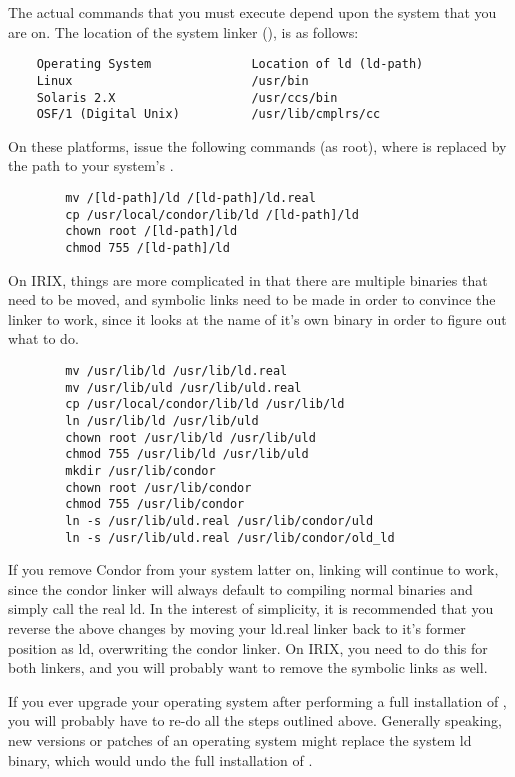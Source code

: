 The actual commands that you must execute depend upon the system that you
are on.  The location of the system linker (), is as follows:
\begin{verbatim}
	Operating System              Location of ld (ld-path)
	Linux                         /usr/bin
	Solaris 2.X                   /usr/ccs/bin
	OSF/1 (Digital Unix)          /usr/lib/cmplrs/cc
\end{verbatim}

On these platforms, issue the following commands (as root), where
 is replaced by the path to your system's .
\begin{verbatim}
        mv /[ld-path]/ld /[ld-path]/ld.real
        cp /usr/local/condor/lib/ld /[ld-path]/ld
        chown root /[ld-path]/ld
        chmod 755 /[ld-path]/ld
\end{verbatim}

On IRIX, things are more complicated in that there are multiple
 binaries that need to be moved, and symbolic links need to
be made in order to convince the linker to work, since it looks at the
name of it's own binary in order to figure out what to do.
\begin{verbatim}
        mv /usr/lib/ld /usr/lib/ld.real
        mv /usr/lib/uld /usr/lib/uld.real
        cp /usr/local/condor/lib/ld /usr/lib/ld
        ln /usr/lib/ld /usr/lib/uld
        chown root /usr/lib/ld /usr/lib/uld
        chmod 755 /usr/lib/ld /usr/lib/uld
        mkdir /usr/lib/condor
        chown root /usr/lib/condor
        chmod 755 /usr/lib/condor
        ln -s /usr/lib/uld.real /usr/lib/condor/uld
        ln -s /usr/lib/uld.real /usr/lib/condor/old_ld
\end{verbatim}

If you remove Condor from your system latter on, linking will continue
to work, since the condor linker will always default to compiling
normal binaries and simply call the real ld.  In the interest of
simplicity, it is recommended that you reverse the above changes by
moving your ld.real linker back to it's former position as ld,
overwriting the condor linker.  On IRIX, you need to do this for both
linkers, and you will probably want to remove the symbolic links as
well.

\Note If you ever upgrade your operating system after performing a
full installation of , you will probably have to re-do
all the steps outlined above.
Generally speaking, new versions or patches of an operating system
might replace the system ld binary, which would undo the
full installation of .

